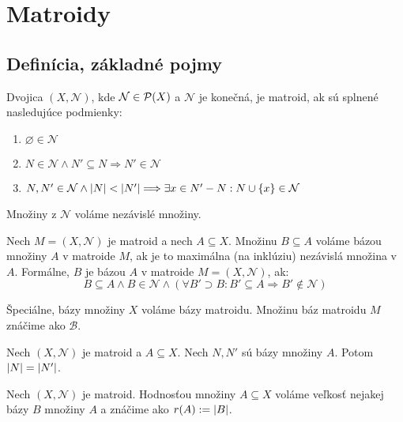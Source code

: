 \chapter{Matroidy}

\section{Definícia, základné pojmy}

\begin{definition}

Dvojica $(X, \mathcal{N})$, kde $\mathcal{N} \in \mathcal{P}(X)$ a $\mathcal{N}$ je konečná, je matroid, ak sú splnené nasledujúce podmienky:
\begin{enumerate}
    \item $\varnothing \in \mathcal{N}$
    \item $N \in \mathcal{N} \wedge N' \subseteq N \Longrightarrow N' \in \mathcal{N}$
    \item $N, N' \in \mathcal{N} \wedge \left|N\right| < \left|N'\right| \Longrightarrow \exists x \in N' - N: N \cup \left\{x\right\} \in \mathcal{N}$
\end{enumerate}

Množiny z $\mathcal{N}$ voláme nezávislé množiny. 
\end{definition}

\begin{definition}
Nech $M = (X, \mathcal{N})$ je matroid a nech $A \subseteq X$. Množinu $B \subseteq A$ voláme bázou množiny $A$ v matroide $M$, ak 
je to maximálna (na inklúziu) nezávislá množina v $A$. Formálne, $B$ je bázou $A$ v matroide $M=(X, \mathcal{N})$, ak:
$$B \subseteq A \wedge B \in \mathcal{N} \wedge \left( \forall B' \supset B: B' \subseteq A \Longrightarrow B' \not\in\mathcal{N} \right)$$

Špeciálne, bázy množiny $X$ voláme bázy matroidu. Množinu báz matroidu $M$ znáčime ako $\mathcal{B}$.
\end{definition}

\begin{theorem}
Nech $(X, \mathcal{N})$ je matroid a $A \subseteq X$. Nech $N, N'$ sú bázy množiny $A$. Potom $\left|N\right| = \left|N'\right|$.
\end{theorem}

\begin{definition}
Nech $(X, \mathcal{N})$ je matroid. Hodnosťou množiny $A \subseteq X$ voláme veľkosť nejakej bázy $B$ množiny $A$ a znáčime ako $r(A) := \left|B\right|$.
\end{definition}

